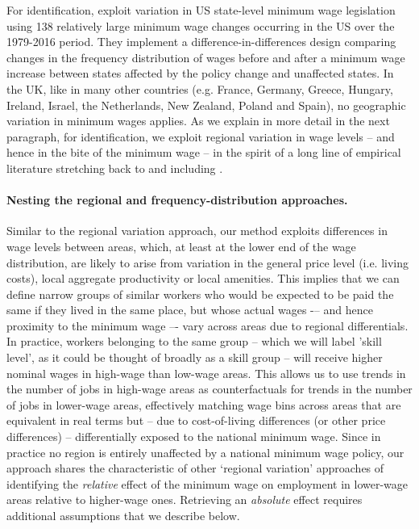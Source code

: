 For identification, \cite{Cengiz2019} exploit variation in US state-level minimum wage legislation using 138 relatively large minimum wage changes occurring in the US over the 1979-2016 period. They implement a difference-in-differences design comparing changes in the frequency distribution of wages before and after a minimum wage increase between states affected by the policy change and unaffected states. In the UK, like in many other countries (e.g. France, Germany, Greece, Hungary, Ireland, Israel, the Netherlands, New Zealand, Poland and Spain), no geographic variation in minimum wages applies. As we explain in more detail in the next paragraph, for identification, we exploit regional variation in wage levels -- and hence in the bite of the minimum wage -- in the spirit of a long line of empirical literature stretching back to \cite{Card1992} and including  \cite{Stewart2002,Dolton2012,Dolton2015,Ahlfeldt2018,Caliendo2018,ClemensWither2019,Dube2019b,Schmitz2019,Dustmann2021}. 

\paragraph{Nesting the regional and frequency-distribution approaches.} Similar to the regional variation approach, our method exploits differences in wage levels between areas, which, at least at the lower end of the wage distribution, are likely to arise from variation in the general price level (i.e. living costs), local aggregate productivity or local amenities. This implies that we can define narrow groups of similar workers who would be expected to be paid the same if they lived in the same place, but whose actual wages -– and hence proximity to the minimum wage –- vary across areas due to regional differentials. In practice, workers belonging to the same group -- which we will label 'skill level', as it could be thought of broadly as a skill group -- will receive higher nominal wages in high-wage than low-wage areas. This allows us to use trends in the number of jobs in high-wage areas as counterfactuals for trends in the number of jobs in lower-wage areas, effectively matching wage bins across areas that are equivalent in real terms but -- due to cost-of-living differences (or other price differences) -- differentially exposed to the national minimum wage. Since in practice no region is entirely unaffected by a national minimum wage policy, our approach shares the characteristic of other `regional variation' approaches of identifying the \textit{relative} effect of the minimum wage on employment in lower-wage areas relative to higher-wage ones. Retrieving an \textit{absolute} effect requires additional assumptions that we describe below. \par 

